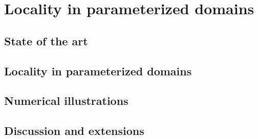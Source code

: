\chapter{Locality in parameterized domains}\label{ch:locality-in-parameterized-domains}



\section{State of the art}\label{sec:state-of-the-art2}


\section{Locality in parameterized domains}\label{sec:exploiting-locality-in-parameterized-domains}


\section{Numerical illustrations}\label{sec:numerical_taylor}


\section{Discussion and extensions}\label{sec:discussion_taylor_num}


\newpage\null\newpage\null\thispagestyle{empty}